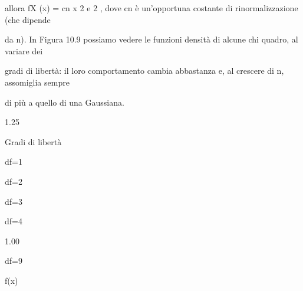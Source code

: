 \documentclass[a4paper,portrait,12pt]{article}
\begin{document}
\begin{flushleft}
allora fX (x) = cn x 2 e 2 , dove cn \`{e} un'opportuna costante di rinormalizzazione (che dipende
\end{flushleft}


\begin{flushleft}
da n). In Figura 10.9 possiamo vedere le funzioni densit\`{a} di alcune chi quadro, al variare dei
\end{flushleft}


\begin{flushleft}
gradi di libert\`{a}: il loro comportamento cambia abbastanza e, al crescere di n, assomiglia sempre
\end{flushleft}


\begin{flushleft}
di più a quello di una Gaussiana.
\end{flushleft}





1.25





\begin{flushleft}
Gradi di libert\`{a}
\end{flushleft}


\begin{flushleft}
df=1
\end{flushleft}


\begin{flushleft}
df=2
\end{flushleft}


\begin{flushleft}
df=3
\end{flushleft}


\begin{flushleft}
df=4
\end{flushleft}





1.00





\begin{flushleft}
df=9
\end{flushleft}





\begin{flushleft}
f(x)
\end{flushleft}
\end{document}
